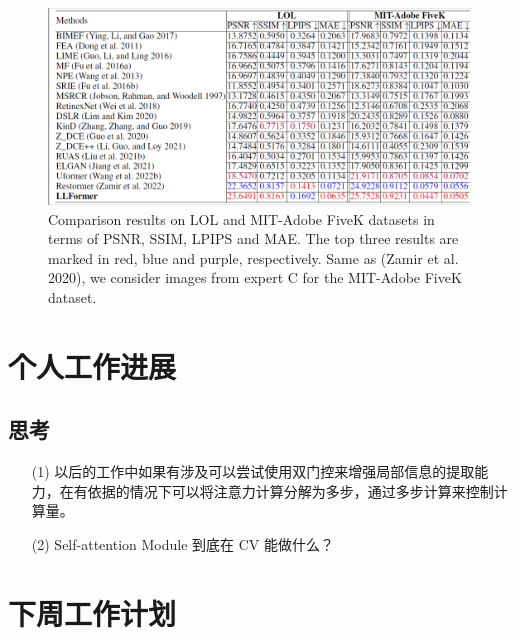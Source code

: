\documentclass[letterpaper,10pt]{article}
\begin{document}
	\begin{figure}[htbp]
		\centering 
		\includegraphics[width=\columnwidth]{picture/Results_on_LOL_and_MIT-Adobe_FiveK}
		\captionsetup{font=scriptsize}
		\caption{
			\label{fig: result_in_LOL_and_MIT} %
			Comparison results on LOL and MIT-Adobe FiveK datasets in terms of PSNR, SSIM, LPIPS and MAE. The top three results are marked in red, blue and purple, respectively. Same as (Zamir et al. 2020), we consider images from expert C for the MIT-Adobe FiveK dataset.
		}
	\end{figure}
	
	\section{个人工作进展}
	
	\subsection{思考}
	
	\begin{itemize}
		\item [(1)] 以后的工作中如果有涉及可以尝试使用双门控来增强局部信息的提取能力，在有依据的情况下可以将注意力计算分解为多步，通过多步计算来控制计算量。
		
		\item [(2)] Self-attention Module 到底在 CV 能做什么？
		
	\end{itemize}

	
	\section{下周工作计划}
	
\end{document}
